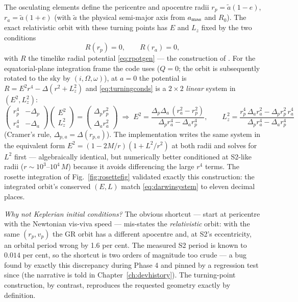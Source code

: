 The osculating elements define the pericentre and apocentre radii
$r_p = \tilde a(1-e)$, $r_a = \tilde a(1+e)$ (with $\tilde a$ the
physical semi-major axis from $a_{\rm mas}$ and $R_0$). The exact
relativistic orbit with these turning points has $E$ and $L_z$ fixed by
the two conditions
\begin{equation}
R(r_p) = 0, \qquad R(r_a) = 0,
\label{eq:turningconds}
\end{equation}
with $R$ the timelike radial potential \eqref{eq:rpotgen} — the
construction of \citet{Darwin1959}. For the equatorial-plane
integration frame the code uses ($Q = 0$; the orbit is subsequently
rotated to the sky by $(i, \Omega, \omega)$), at $a = 0$ the potential
is $R = E^2r^4 - \Delta(r^2 + L_z^2)$ and \eqref{eq:turningconds} is a
$2\times2$ \emph{linear} system in $(E^2, L_z^2)$:
\begin{equation}
\begin{pmatrix} r_p^4 & -\Delta_p \\ r_a^4 & -\Delta_a \end{pmatrix}
\begin{pmatrix} E^2 \\ L_z^2 \end{pmatrix}
=
\begin{pmatrix} \Delta_p r_p^2 \\ \Delta_a r_a^2 \end{pmatrix}
\;\Longrightarrow\;
E^2 = \frac{\Delta_p\Delta_a\,(r_a^2 - r_p^2)}
           {\Delta_p r_a^4 - \Delta_a r_p^4},
\qquad
L_z^2 = \frac{r_p^4\,\Delta_a r_a^2 - \Delta_p r_p^2\, r_a^4}
             {\Delta_p r_a^4 - \Delta_a r_p^4}
\label{eq:darwinsystem}
\end{equation}
(Cramer's rule, $\Delta_{p,a} = \Delta(r_{p,a})$). The implementation
writes the same system in the equivalent form
$E^2 = (1 - 2M/r)(1 + L^2/r^2)$ at both radii and solves for $L^2$
first — algebraically identical, but numerically better conditioned at
S2-like radii ($r \sim 10^3$--$10^4\,M$) because it avoids
differencing the large $r^4$ terms. The rosette integration of
Fig.~\ref{fig:rosettefig}
validated exactly this construction: the integrated orbit's conserved
$(E, L)$ match \eqref{eq:darwinsystem} to eleven decimal places.

\emph{Why not Keplerian initial conditions?} The obvious shortcut —
start at pericentre with the Newtonian vis-viva speed — mis-states the
\emph{relativistic} orbit: with the same $(r_p, v_p)$ the GR orbit has a
different apocentre and, at S2's eccentricity, an orbital period wrong
by 1.6 per cent. The measured S2 period is known to $0.014$ per cent,
so the shortcut is two orders of magnitude too crude — a bug found by
exactly this discrepancy during Phase 4 and pinned by a regression test
since (the narrative is told in Chapter~\ref{ch:devhistory}). The
turning-point construction, by contrast, reproduces the requested
geometry exactly by definition.

